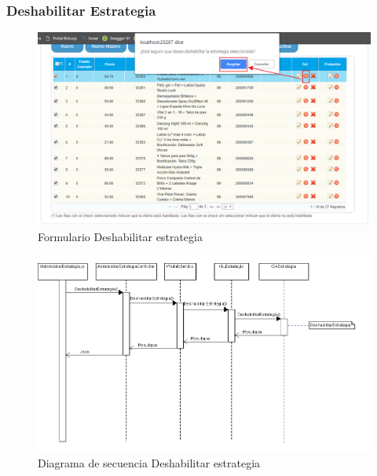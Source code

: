 \documentclass[a4paper,11pt]{paper}
\begin{document}
\subsubsection{Deshabilitar Estrategia}
\begin{figure}[h]
\centering
\includegraphics[width=1.0\textwidth]{imgs/Estrategia/FormularioDeshabilitar.png}
\caption{Formulario Deshabilitar estrategia}
\end{figure}

\newpage
\begin{landscape}
\begin{figure}[!h]
\centering
\includegraphics[width=1.5\textwidth]{imgs/Estrategia/Deshabilitar.png}
\caption{Diagrama de secuencia Deshabilitar estrategia}
\end{figure}
\end{landscape} 


\newpage
\end{document}
